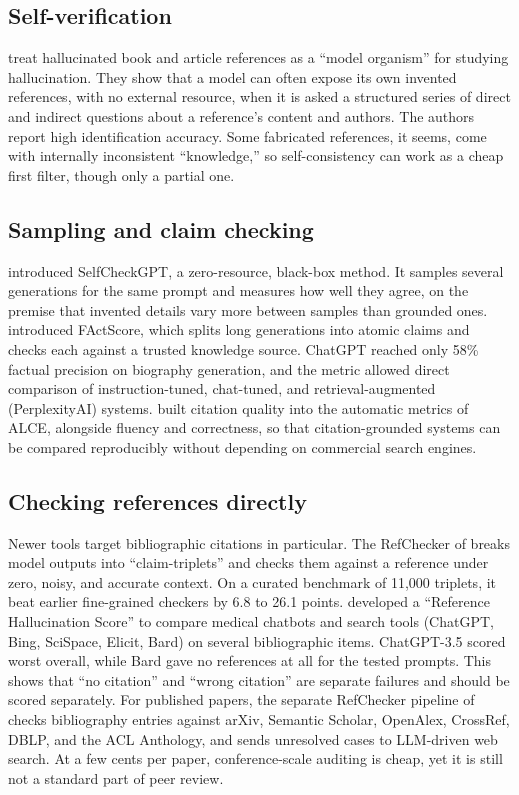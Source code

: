 \documentclass[acmsmall,screen]{acmart}
\begin{document}
\subsection{Self-verification}
\citet{agrawal2023} treat hallucinated book and article references as a ``model organism'' for studying hallucination. They show that a model can often expose its own invented references, with no external resource, when it is asked a structured series of direct and indirect questions about a reference's content and authors. The authors report high identification accuracy. Some fabricated references, it seems, come with internally inconsistent ``knowledge,'' so self-consistency can work as a cheap first filter, though only a partial one.

\subsection{Sampling and claim checking}
\citet{manakul2023} introduced SelfCheckGPT, a zero-resource, black-box method. It samples several generations for the same prompt and measures how well they agree, on the premise that invented details vary more between samples than grounded ones. \citet{min2023} introduced FActScore, which splits long generations into atomic claims and checks each against a trusted knowledge source. ChatGPT reached only 58\% factual precision on biography generation, and the metric allowed direct comparison of instruction-tuned, chat-tuned, and retrieval-augmented (PerplexityAI) systems. \citet{gao2023} built citation quality into the automatic metrics of ALCE, alongside fluency and correctness, so that citation-grounded systems can be compared reproducibly without depending on commercial search engines.

\subsection{Checking references directly}
Newer tools target bibliographic citations in particular. The RefChecker of \citet{hu2024} breaks model outputs into ``claim-triplets'' and checks them against a reference under zero, noisy, and accurate context. On a curated benchmark of 11,000 triplets, it beat earlier fine-grained checkers by 6.8 to 26.1 points. \citet{aljamaan2024} developed a ``Reference Hallucination Score'' to compare medical chatbots and search tools (ChatGPT, Bing, SciSpace, Elicit, Bard) on several bibliographic items. ChatGPT-3.5 scored worst overall, while Bard gave no references at all for the tested prompts. This shows that ``no citation'' and ``wrong citation'' are separate failures and should be scored separately. For published papers, the separate RefChecker pipeline of \citet{russinovich2026b} checks bibliography entries against arXiv, Semantic Scholar, OpenAlex, CrossRef, DBLP, and the ACL Anthology, and sends unresolved cases to LLM-driven web search. At a few cents per paper, conference-scale auditing is cheap, yet it is still not a standard part of peer review.
\end{document}
